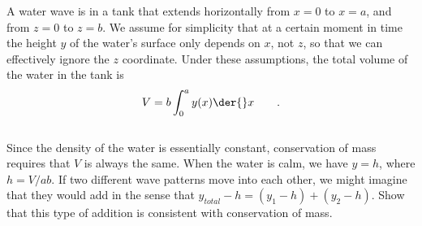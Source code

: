         A water wave is in a tank that extends horizontally from $x=0$ to $x=a$, and
        from $z=0$ to $z=b$. We assume for simplicity that at a certain moment
        in time the height $y$ of the water's
        surface only depends on $x$, not $z$, so that we can effectively ignore the
        $z$ coordinate. Under these assumptions, the total volume of the water in the tank
        is \begin{displaymath}V = b \int_0^a{y(x) \der{}x}\qquad.\end{displaymath}\\
        Since the density of the water is essentially
        constant, conservation of mass requires that $V$ is always the same. When the
        water is calm, we have $y=h$, where $h=V/ab$. If two different wave patterns move
        into each other, we might imagine that they would add in the sense that $y_{total}-h
        = (y_1-h) + (y_2-h)$. Show that this type of addition is consistent with conservation
        of mass. 
